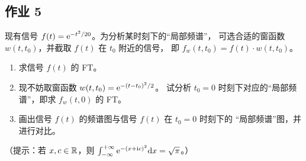\subsection{作业 5}

\begin{homework}
    现有信号 $f(t) = \mathrm{e}^{-t^2/20}$。为分析某时刻下的``局部频谱''，
    可选合适的窗函数 $w(t, t_0)$，并截取 $f(t)$ 在 $t_0$ 附近的信号，
    即 $f_w(t, t_0) = f(t)\cdot w(t, t_0)$。
    \begin{enumerate}[label=(\arabic*)]
        \item 求信号 $f(t)$ 的 FT。
        \item 现不妨取窗函数 $w(t, t_0) = \mathrm{e}^{-(t - t_0)^2/2}$。
            试分析 $t_0 = 0$ 时刻下对应的``局部频谱''，即求 $f_w(t, 0)$ 的 FT。
        \item 画出信号 $f(t)$ 的频谱图与信号 $f(t)$ 在 $t_0 = 0$ 时刻下的
            ``局部频谱''图，并进行对比。
    \end{enumerate}
    （提示：若 $x, c \in \mathbb{R}$，则 $\int_{-\infty}^{+\infty}\mathrm{e}^{-(x + \mathrm{i} c)^2}\mathrm{d}x = \sqrt{\pi}$。）
\end{homework}
